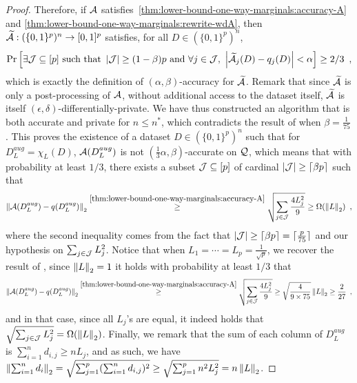 \begin{proof}
  Therefore, if $\mathcal A$ satisfies~\eqref{thm:lower-bound-one-way-marginals:accuracy-A}
  and \eqref{thm:lower-bound-one-way-marginals:rewrite-wdA}, then
  $\widetilde {\mathcal A} : (\{0, 1\}^p)^n \rightarrow [0, 1]^p$ satisfies,
  for all $D \in (\{0, 1\}^p)^n$,
  \begin{align}
    \label{thm:lower-bound-one-way-marginals:accuracy-widetildeA}
    \textnormal{Pr} \left[  \exists \mathcal J \subseteq [p]~\text{such that }\left| \mathcal J \right|
      \ge (1 - \beta)p \text{ and }\forall j \in \mathcal J,~
      \left| \widetilde {\mathcal A}_j(D) - q_j(D) \right| < \alpha  \right]
    \ge 2/3\enspace,
  \end{align}
  which is exactly the definition of $(\alpha, \beta)$-accuracy for $\widetilde{\mathcal A}$.
  Remark that since $\widetilde{\mathcal A}$ is only a post-processing of $\mathcal A$, without
  additional access to the dataset itself, $\widetilde{\mathcal A}$ is itself
  $(\epsilon, \delta)$-differentially-private.
  We have thus constructed an algorithm that is both accurate and private for
  $n \le n^*$, which contradicts the result of
   when $\beta = \frac{1}{75}$.
  This proves the existence of a dataset $D \in (\{0, 1\}^p)^n$ such that
  for $D_L^{aug} = \chi_L(D)$, $\mathcal A(D_L^{aug})$ is not
  $(\tfrac{1}{3}\alpha, \beta)$-accurate on $\mathcal Q$, which means that with
  probability at least $1/3$, there exists a subset $\mathcal J \subseteq [p]$ of
  cardinal $\left| \mathcal J \right| \ge \lceil \beta p \rceil$ such that
  \begin{align}
    \label{eq:thm:lower-bound-one-way-marginals:upper-bound-normL}
    \left \lVert \mathcal A(D_L^{aug}) - q(D_L^{aug}) \right \rVert_2
    \overset{\eqref{thm:lower-bound-one-way-marginals:accuracy-A}}{\ge}
    \sqrt{\sum_{j \in \mathcal J} \frac{4L_j^2}{9}}
    \ge \Omega( \left \lVert L \right \rVert_2 )\enspace,
  \end{align}
  where the second inequality comes from the fact that
  $\left| \mathcal J \right| \ge  \lceil \beta p \rceil = \lceil \frac{p}{75} \rceil$ and
  our hypothesis on $\sum_{j\in\mathcal J} L_j^2$.
  Notice that when $L_1 = \cdots = L_p = \frac{1}{\sqrt{p}}$, we recover the
  result of \citet{bassily2014Private}, since $\left \lVert L \right \rVert_2 = 1$ it holds
  with probability at least $1/3$ that
  \begin{align}
    \left \lVert \mathcal A(D_L^{aug}) - q(D_L^{aug}) \right \rVert_2
    \overset{\eqref{thm:lower-bound-one-way-marginals:accuracy-A}}{\ge}
    \sqrt{\sum_{j \in \mathcal J} \frac{4L_j^2}{9}}
    \ge \sqrt{\frac{4}{9 \times 75}} \left \lVert L \right \rVert_2
    \ge \frac{2}{27}\enspace,
  \end{align}
  and in that case, since all $L_j$'s are equal, it indeed holds that
  $\sqrt{\sum_{j \in \mathcal J} L_j^2} = \Omega(\left \lVert L \right \rVert_2)$.
  Finally, we remark that the sum of each column of $D_L^{aug}$ is
  $\sum_{i=1}^n d_{i,j} \ge n L_j$, and as such, we have
  $\left \lVert \sum_{i=1}^n d_i \right \rVert_2 = \sqrt{\sum_{j=1}^p (\sum_{i=1}^n d_{i,j})^2}
    \ge \sqrt{\sum_{j=1}^p n^2 L_j^2} = n \left \lVert L \right \rVert_2$.


\end{proof}
